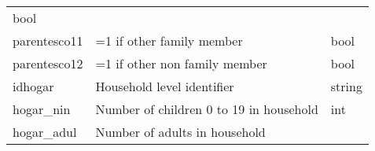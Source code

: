 \documentclass[11pt]{article}
\begin{document}
\begin{longtable}[]{@{}lll@{}}
\begin{minipage}[t]{0.24\columnwidth}
bool\strut
\end{minipage}\tabularnewline
\begin{minipage}[t]{0.19\columnwidth}\raggedright\strut
parentesco11\strut
\end{minipage} & \begin{minipage}[t]{0.16\columnwidth}\raggedright\strut
=1 if other family member\strut
\end{minipage} & \begin{minipage}[t]{0.24\columnwidth}\raggedright\strut
bool\strut
\end{minipage}\tabularnewline
\begin{minipage}[t]{0.19\columnwidth}\raggedright\strut
parentesco12\strut
\end{minipage} & \begin{minipage}[t]{0.16\columnwidth}\raggedright\strut
=1 if other non family member\strut
\end{minipage} & \begin{minipage}[t]{0.24\columnwidth}\raggedright\strut
bool\strut
\end{minipage}\tabularnewline
\begin{minipage}[t]{0.19\columnwidth}\raggedright\strut
idhogar\strut
\end{minipage} & \begin{minipage}[t]{0.16\columnwidth}\raggedright\strut
Household level identifier\strut
\end{minipage} & \begin{minipage}[t]{0.24\columnwidth}\raggedright\strut
string\strut
\end{minipage}\tabularnewline
\begin{minipage}[t]{0.19\columnwidth}\raggedright\strut
hogar\_nin\strut
\end{minipage} & \begin{minipage}[t]{0.16\columnwidth}\raggedright\strut
Number of children 0 to 19 in household\strut
\end{minipage} & \begin{minipage}[t]{0.24\columnwidth}\raggedright\strut
int\strut
\end{minipage}\tabularnewline
\begin{minipage}[t]{0.19\columnwidth}\raggedright\strut
hogar\_adul\strut
\end{minipage} & \begin{minipage}[t]{0.16\columnwidth}\raggedright\strut
Number of adults in household\strut
\end{minipage} & \begin{minipage}[t]{0.24\columnwidth}\raggedright\strut

\end{minipage}
\end{longtable}
\end{document}

